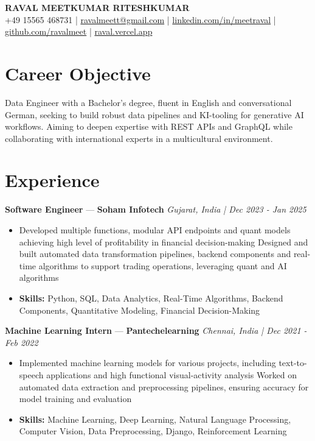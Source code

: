 \documentclass[a4paper,10pt]{article}
\begin{document}
\begin{center}
  {\Large\bfseries RAVAL MEETKUMAR RITESHKUMAR}\\[2pt]
  {\small +49 15565 468731 \;|\; \href{mailto:ravalmeett@gmail.com}{ravalmeett@gmail.com} \;|\; \href{https://www.linkedin.com/in/meetraval/}{linkedin.com/in/meetraval} \;|\; \href{https://github.com/ravalmeet}{github.com/ravalmeet} \;|\; \href{https://raval.vercel.app/}{raval.vercel.app}}
\end{center}
\vspace{-3pt}

\section*{Career Objective}
Data Engineer with a Bachelor's degree, fluent in English and conversational German, seeking to build robust data pipelines and KI-tooling for generative AI workflows. Aiming to deepen expertise with REST APIs and GraphQL while collaborating with international experts in a multicultural environment.\par

\section*{Experience}
\textbf{Software Engineer} — \textbf{Soham Infotech} \hfill \textit{Gujarat, India \;|\; Dec 2023 - Jan 2025}\par
\vspace{1pt}
\begin{itemize}
  \item Developed multiple functions, modular API endpoints and quant models achieving high level of profitability in financial decision-making Designed and built automated data transformation pipelines, backend components and real-time algorithms to support trading operations, leveraging quant and AI algorithms
  \item \textbf{Skills:} Python, SQL, Data Analytics, Real-Time Algorithms, Backend Components, Quantitative Modeling, Financial Decision-Making
\end{itemize}
\vspace{3pt}
\textbf{Machine Learning Intern} — \textbf{Pantechelearning} \hfill \textit{Chennai, India \;|\; Dec 2021 - Feb 2022}\par
\vspace{1pt}
\begin{itemize}
  \item Implemented machine learning models for various projects, including text-to-speech applications and high functional visual-activity analysis Worked on automated data extraction and preprocessing pipelines, ensuring accuracy for model training and evaluation
  \item \textbf{Skills:} Machine Learning, Deep Learning, Natural Language Processing, Computer Vision, Data Preprocessing, Django, Reinforcement Learning
\end{itemize}
\end{document}
